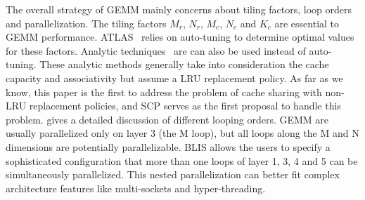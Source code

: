 The overall strategy of GEMM mainly concerns about
tiling factors, loop orders and parallelization.
The tiling factors $M_r$, $N_r$, $M_c$, $N_c$ and $K_c$
are essential to GEMM performance.
ATLAS~\cite{atlas} relies on auto-tuning to determine optimal
values for these factors.
Analytic techniques~\cite{analytic1,analytic2,blisanalytic} are
can also be used instead of auto-tuning.
These analytic methods generally take into consideration
the cache capacity and associativity
but assume a LRU replacement policy.
As far as we know, this paper is the first to
address the problem of cache sharing with non-LRU replacement policies,
and SCP serves as the first proposal to handle this problem.
\cite{gotogemm} gives a detailed discussion of different looping orders.
GEMM are usually parallelized only on layer 3 (the M loop),
but all loops along the M and N dimensions are potentially parallelizable.
BLIS\cite{blispar} allows the users to specify a sophisticated configuration
that more than one loops of layer 1, 3, 4 and 5
can be simultaneously parallelized.
This nested parallelization can better fit complex architecture features
like multi-sockets and hyper-threading. 

